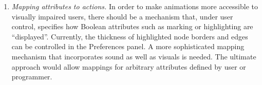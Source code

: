 \begin{enumerate}
\item
  \emph{Mapping attributes to actions.}
  In order to make animations more accessible to visually impaired users,
  there should be a mechanism that, under user control, specifies how Boolean
  attributes such as marking or highlighting are ``displayed''.
  Currently, the thickness of highlighted node borders and edges can be
  controlled in the \textsf{Preferences} panel.
  A more sophisticated mapping mechanism that incorporates sound as well as visuals is needed.
  The ultimate approach would allow mappings for arbitrary attributes
  defined by user or programmer.
  
\end{enumerate}
